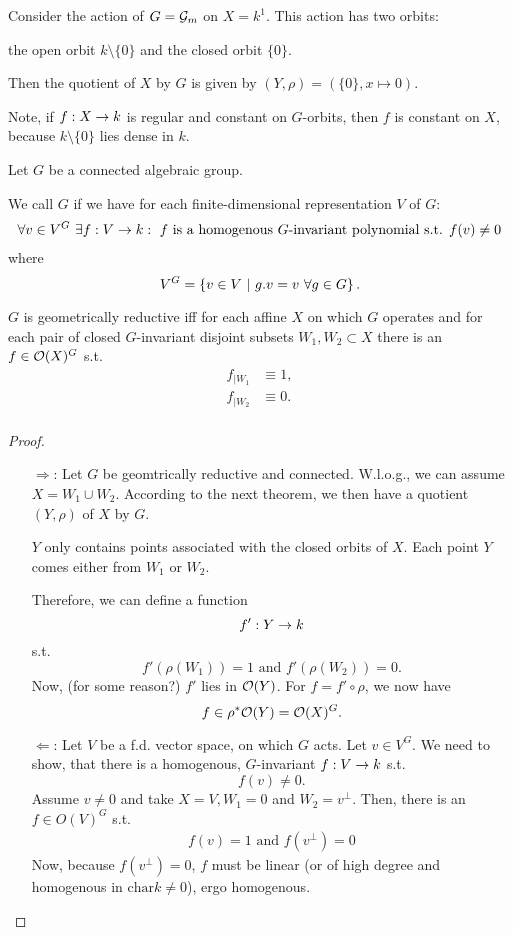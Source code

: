 \begin{example}
	Consider the action of $G = \mathcal{G}_m$ on $X = k^1$. This action has two orbits:
	
	the open orbit $k \setminus \{0\}$ and the closed orbit $\{0\}$.
	
	Then the quotient of $X$ by $G$ is given by $(Y,\rho) = (\{0\}, x \mapsto 0)$.
	
	Note, if $f : X \overset{}{\rightarrow} k$ is regular and constant on $G$-orbits, then $f$ is constant on $X$, because $k \setminus \{0\}$ lies dense in $k$.
\end{example}
\begin{definition}
Let $G$ be a connected algebraic group.

We call $G$  if we have for each finite-dimensional representation $V$ of $G$:
\begin{align*}
\forall v \in V^G ~ \exists f : V \overset{}{\rightarrow} k :~ f \text{ is a homogenous }G\text{-invariant polynomial s.t. }f(v) \neq 0
\end{align*}
where
\[V^G = \left\lbrace v\in V ~ | ~ g.v = v ~\forall g \in G\right\rbrace. \]
\end{definition}
\begin{remark}
	$G$ is geometrically reductive iff for each affine $X$ on which $G$ operates and for each pair of closed $G$-invariant disjoint subsets $W_1, W_2 \subset X$ there is an $f \in \mathcal{O}(X)^G$ s.t.
	\begin{align*}
	f_{|W_1} &\equiv 1,\\
	f_{|W_2} &\equiv 0.\\
	\end{align*}
\end{remark}
\begin{proof}
	\begin{enumerate}
		\item[$\Rightarrow$:] Let $G$ be geomtrically reductive and connected. W.l.o.g., we can assume $X = W_1 \cup W_2$. According to the next theorem, we then have a quotient $(Y,\rho)$ of $X$ by $G$.
		
		$Y$ only contains points associated with the closed orbits of $X$. Each point $Y$ comes either from $W_1$ or $W_2$.

		 Therefore, we can define a function
		\[f' : Y \overset{}{\rightarrow} k \]
		s.t.
		\[ f'(\rho(W_1)) = 1 \text{  and  } f'(\rho(W_2)) = 0. \]
		Now, (for some reason?) $f'$ lies in $\mathcal{O}(Y)$. For $f = f'\circ \rho$, we now have
		\[ f \in \rho^*\mathcal{O}(Y) = \mathcal{O}(X)^G.  \]
		\item[$\Leftarrow$:] Let $V$ be a f.d. vector space, on which $G$ acts. Let $v \in V^G$. We need to show, that there is a homogenous, $G$-invariant $f : V \overset{}{\rightarrow} k$ s.t.
		\[ f(v) \neq 0. \]
		Assume $v \neq 0$ and take $X = V, W_1 = 0$ and $W_2 = v^\bot$. Then, there is an $f \in O(V)^G$ s.t.
		\begin{align*}
		f(v) = 1\text{  and  } f(v^\bot) = 0
		\end{align*}
		Now, because $f(v^\bot) = 0$, $f$ must be linear (or of high degree and homogenous in $\mathrm{char} k \neq 0$), ergo homogenous.
	\end{enumerate}
\end{proof}

